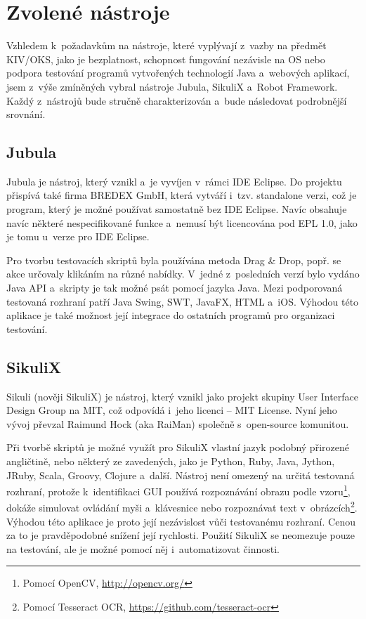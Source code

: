 \chapter{Zvolené nástroje}
Vzhledem k~požadavkům na nástroje, které vyplývají z~vazby na předmět KIV/OKS, jako je bezplatnost, schopnost fungování nezávisle na OS nebo podpora testování programů vytvořených technologií Java a~webových aplikací, jsem z~výše zmíněných vybral nástroje Jubula, SikuliX a~Robot Framework. Každý z~nástrojů bude stručně charakterizován a~bude následovat podrobnější srovnání.
	\section{Jubula}
	Jubula je nástroj, který vznikl a~je vyvíjen v~rámci IDE Eclipse. Do projektu přispívá také firma BREDEX GmbH, která vytváří i~tzv. standalone verzi, což je program, který je možné používat samostatně bez IDE Eclipse. Navíc obsahuje navíc některé nespecifikované funkce a~nemusí být licencována pod EPL 1.0, jako je tomu u~verze pro IDE Eclipse.
	
	Pro tvorbu testovacích skriptů byla používána metoda Drag \& Drop, popř. se akce určovaly klikáním na různé nabídky. V~jedné z~posledních verzí bylo vydáno Java API a~skripty je tak možné psát pomocí jazyka Java. Mezi podporovaná testovaná rozhraní patří Java Swing, SWT, JavaFX, HTML a~iOS. Výhodou této aplikace je také možnost její integrace do ostatních programů pro organizaci testování.
	
	\section{SikuliX}
	Sikuli (nověji SikuliX) je nástroj, který vznikl jako projekt skupiny User Interface Design Group na MIT, což odpovídá i~jeho licenci -- MIT License. Nyní jeho vývoj převzal Raimund Hock (aka RaiMan) společně s~open-source komunitou.
	
	Při tvorbě skriptů je možné využít pro SikuliX vlastní jazyk podobný přirozené angličtině, nebo některý ze zavedených, jako je Python, Ruby, Java, Jython, JRuby, Scala, Groovy, Clojure a~další. Nástroj není omezený na určitá testovaná rozhraní, protože k~identifikaci GUI používá rozpoznávání obrazu podle vzoru\footnote{Pomocí OpenCV, \url{http://opencv.org/}}, dokáže simulovat ovládání myši a~klávesnice nebo rozpoznávat text v~obrázcích\footnote{Pomocí Tesseract OCR, \url{https://github.com/tesseract-ocr}}. Výhodou této aplikace je proto její nezávislost vůči testovanému rozhraní. Cenou za to je pravděpodobné snížení její rychlosti. Použití SikuliX se neomezuje pouze na testování, ale je možné pomocí něj i~automatizovat činnosti.
	
